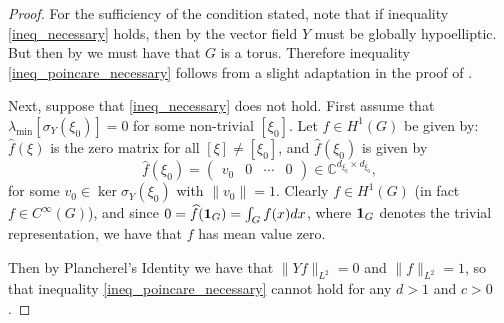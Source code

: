 \documentclass[11pt]{amsart}
\numberwithin{theorem}{section}
\numberwithin{equation}{section}
\theoremstyle{definition}
\numberwithin{example}{section}
\theoremstyle{definition}
\theoremstyle{definition}
\newcommand{\C}{\mathbb{C}}
\begin{document}
\begin{proof}
For the sufficiency of the condition stated, note that if inequality \eqref{ineq_necessary} holds, then by \cite{strongly_invariant_KW,tese-Nicholas} the vector field $Y$ must be globally hypoelliptic. But then by \cite{GW_GH_vector_fields} we must have that $G$ is a torus. Therefore inequality \eqref{ineq_poincare_necessary} follows from a slight adaptation in the proof of \cite[Theorem 1]{directional_Poincare}.

    Next, suppose that \eqref{ineq_necessary} does not hold. First assume that  $\lambda_{\min}[\sigma_Y(\xi_0)]=0$ for some non-trivial  $[\xi_0]$. Let $f\in H^1(G)$ be given by: $\widehat{f}(\xi)$ is the zero matrix for all $[\xi]\neq [\xi_0]$, and $\widehat{f}(\xi_0)$ is given by 
\begin{equation*}
    \widehat{f}(\xi_0)=\begin{pmatrix}
      v_0 & 0 & \cdots & 0  
    \end{pmatrix}\in\C^{d_{\xi_0}\times d_{\xi_0}},
\end{equation*}
for some $v_0\in\ker \sigma_Y(\xi_0)$ with $\|v_0\|=1$. Clearly $f\in H^1(G)$ (in fact $f\in C^\infty(G)$), and since $0=\widehat{f}({\bf1}_G)=\int_Gf(x)dx$, where ${\bf1}_G$ denotes the trivial representation, we have that $f$ has mean value zero.

Then by Plancherel's Identity we have that $\|Yf\|_{L^2}=0$ and $\|f\|_{L^2}=1$, so that inequality \eqref{ineq_poincare_necessary} cannot hold for any $d>1$ and $c>0$.


\end{proof}
\end{document}
